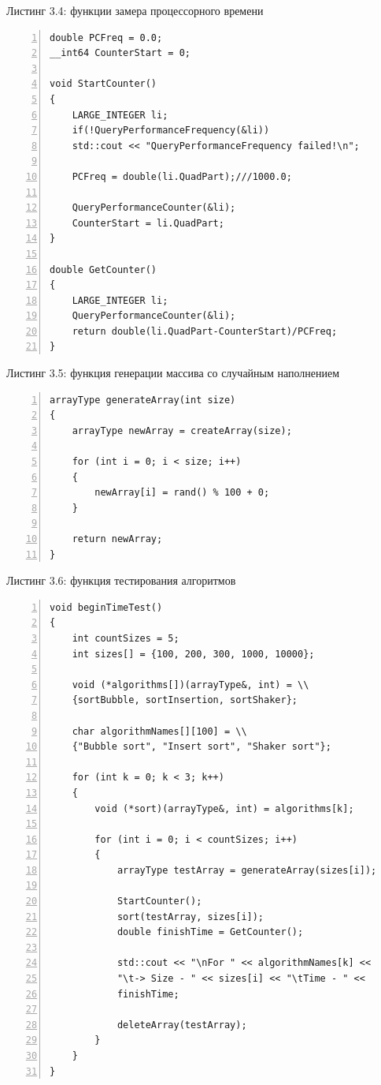 \documentclass[12pt,a4paper]{report}
\begin{document}
\textrm{Листинг 3.4: функции замера процессорного времени}
\begin{lstlisting}[frame=single, numbers=left]
double PCFreq = 0.0;
__int64 CounterStart = 0;
    
void StartCounter()
{
    LARGE_INTEGER li;
    if(!QueryPerformanceFrequency(&li))
    std::cout << "QueryPerformanceFrequency failed!\n";
    
    PCFreq = double(li.QuadPart);///1000.0;
    
    QueryPerformanceCounter(&li);
    CounterStart = li.QuadPart;
}
    
double GetCounter()
{
    LARGE_INTEGER li;
    QueryPerformanceCounter(&li);
    return double(li.QuadPart-CounterStart)/PCFreq;
}
\end{lstlisting}

\textrm{Листинг 3.5: функция генерации массива со случайным наполнением}
\begin{lstlisting}[frame=single, numbers=left]
arrayType generateArray(int size)
{
    arrayType newArray = createArray(size);
    
    for (int i = 0; i < size; i++) 
    {
        newArray[i] = rand() % 100 + 0;
    }
    
    return newArray;
}
\end{lstlisting}

\textrm{Листинг 3.6: функция тестирования алгоритмов}
\begin{lstlisting}[frame=single, numbers=left]
void beginTimeTest()
{
    int countSizes = 5;
    int sizes[] = {100, 200, 300, 1000, 10000};
    
    void (*algorithms[])(arrayType&, int) = \\ 
    {sortBubble, sortInsertion, sortShaker}; 
    
    char algorithmNames[][100] = \\
    {"Bubble sort", "Insert sort", "Shaker sort"};
    
    for (int k = 0; k < 3; k++)
    {
        void (*sort)(arrayType&, int) = algorithms[k];
    
        for (int i = 0; i < countSizes; i++)
        {
            arrayType testArray = generateArray(sizes[i]);
                
            StartCounter();
            sort(testArray, sizes[i]);
            double finishTime = GetCounter();
                
            std::cout << "\nFor " << algorithmNames[k] << 
            "\t-> Size - " << sizes[i] << "\tTime - " <<  
            finishTime;
    
            deleteArray(testArray);
        }
    }
}
\end{lstlisting}
\end{document}

